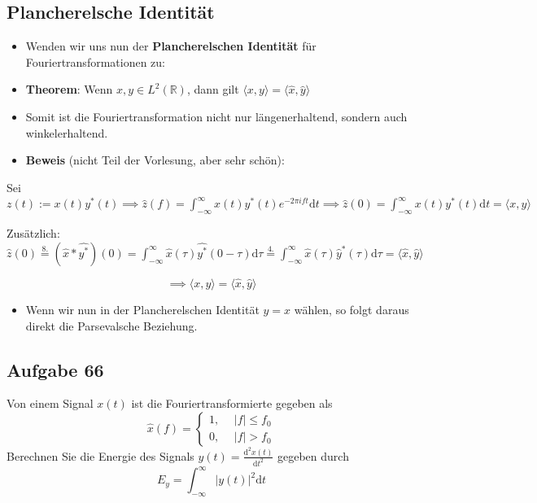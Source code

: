 \documentclass[11pt]{article}
\begin{document}
\subsection*{Plancherelsche Identität}
\vspace*{-0.5cm}
\begin{itemize}[leftmargin=0pt]
    \item[] Wenden wir uns nun der \textbf{Plancherelschen Identität} für Fouriertransformationen zu:
    \item[] \textbf{Theorem}: Wenn $x,y \in L^2(\mathbb{R})$, dann gilt $\langle x, y\rangle = \langle \hat{x}, \hat{y}\rangle$
    \item[] Somit ist die Fouriertransformation nicht nur längenerhaltend, sondern auch winkelerhaltend.
    \item[] \textbf{Beweis} (nicht Teil der Vorlesung, aber sehr schön):
\end{itemize}
\vspace*{-0.5cm}
Sei $z(t) := x(t)y^\ast(t) \implies \hat{z}(f) = \displaystyle\int_{-\infty}^{\infty} x(t)y^\ast(t) e^{-2\pi ift} \text{d}t \implies \hat{z}(0) = \displaystyle\int_{-\infty}^{\infty} x(t)y^\ast(t) \text{d}t = \langle x, y\rangle$

Zusätzlich: $\hat{z}(0) \overset{8.}{=} (\hat{x} \ast \widehat{y^\ast})(0) = \displaystyle\int_{-\infty}^{\infty} \hat{x}(\tau)\widehat{y^\ast}(0-\tau) \text{d}\tau \overset{4.}{=} \displaystyle\int_{-\infty}^{\infty} \hat{x}(\tau)\hat{y}^\ast(\tau) \text{d}\tau = \langle \hat{x}, \hat{y} \rangle$

$$\implies \langle x, y\rangle = \langle \hat{x}, \hat{y}\rangle$$

\vspace*{-0.5cm}
\begin{itemize}[leftmargin=0pt]
    \item[] Wenn wir nun in der Plancherelschen Identität $y = x$ wählen, so folgt daraus direkt die Parsevalsche Beziehung.
\end{itemize}

\pagebreak

\subsection*{Aufgabe 66}
\vspace*{-0.5cm}
Von einem Signal $x(t)$ ist die Fouriertransformierte gegeben als 
$$\hat{x}(f) = \begin{cases}
    1, \hspace{15pt} |f| \leq f_0\\
    0, \hspace{15pt} |f| > f_0
\end{cases}$$
Berechnen Sie die Energie des Signals $y(t) = \displaystyle\frac{\text{d}^2x(t)}{\text{d}t^2}$ gegeben durch
$$E_y = \int_{-\infty}^\infty |y(t)|^2 \text{d}t$$
\end{document}
